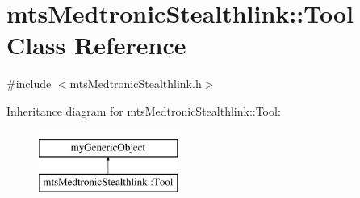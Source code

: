 \hypertarget{classmts_medtronic_stealthlink_1_1_tool}{\section{mts\-Medtronic\-Stealthlink\-:\-:Tool Class Reference}
\label{classmts_medtronic_stealthlink_1_1_tool}
}


{\ttfamily \#include $<$mts\-Medtronic\-Stealthlink.\-h$>$}

Inheritance diagram for mts\-Medtronic\-Stealthlink\-:\-:Tool\-:\begin{figure}[H]
\begin{center}
\leavevmode
\includegraphics[height=2.000000cm]{dd/d1d/classmts_medtronic_stealthlink_1_1_tool}
\end{center}
\end{figure}
